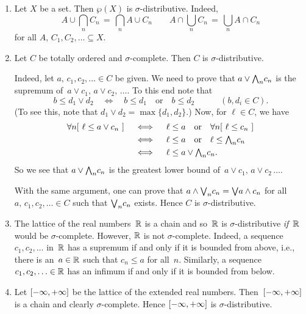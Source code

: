 \begin{exs}
\label{E:sigma-distributive}
\begin{enumerate}
\item
\label{E:sigma-distributive-sets}
Let $X$ be a set. Then $\wp(X)$ is $\sigma$-distributive.
Indeed,  
\begin{equation*}
\textstyle{
A \cup \bigcap_n C_n \,=\, \bigcap_n A \cup C_n
\qquad
A\cap \bigcup_n C_n \,=\, \bigcup_n A \cap C_n}
\end{equation*}
for all $A,\, C_1,C_2,\dotsc \subseteq X$.
\item
Let $C$ be totally ordered
and $\sigma$-complete. Then $C$ is $\sigma$-distributive.

Indeed,
let $a,\,c_1,c_2,\dotsc \in C$ be given.
We need to prove that $a \vee \textstyle{\bigwedge}_n c_n$
is the supremum of~$a\vee c_1,\,a\vee c_2,\,\dotsc$.
To this end note that 
\begin{equation*}
b \leq d_1 \vee d_2 \quad\iff\quad 
b\leq d_1\quad\text{or}\quad b\leq d_2
\qquad\quad(b,d_i\in C).
\end{equation*}
(To see this, note that $d_1 \vee d_2 = \max\{d_1,d_2\}$.)
Now, for $\ell \in C$, we have
\begin{alignat*}{3}
\forall n [\ \ell \leq a \vee c_n \ ]
\quad&\iff\quad
\ell \leq a
    \quad\text{or}\quad
    \forall n[\ \ell \leq c_n\ ] \\
\quad&\iff\quad
\ell \leq a
    \quad\text{or}\quad
    \ell \leq \textstyle{\bigwedge}_n c_n \\
\quad&\iff\quad
\ell \leq a\vee \textstyle{\bigwedge}_n c_n.
\end{alignat*}
So we see 
that $a\vee\textstyle{\bigwedge}_n c_n$ is the greatest 
lower bound of~$a\vee c_1,\,a\vee c_2\,\dotsc$.

With the same argument,
one can prove that $a \wedge \textstyle{\bigvee}_n c_n = \textstyle{\bigvee} a \wedge c_n$
for all $a,\,c_1,c_2,\dotsc \in C$
such that $\textstyle{\bigvee}_n c_n$ exists.
Hence $C$ is $\sigma$-distributive.

\item
The lattice of the real numbers~$\mathbb{R}$ is a chain
and so~$\mathbb{R}$ is $\sigma$-distributive
\emph{if}~$\mathbb{R}$ would be $\sigma$-complete.
However,
$\mathbb{R}$ is not $\sigma$-complete.
Indeed,
a sequence $c_1,c_2,\dotsc$ in~$\mathbb{R}$ has a supremum
if and only if it is bounded from above,
i.e., there is an~$a\in \mathbb{R}$ such that $c_n \leq a$
for all~$n$.
Similarly,
a sequence
$c_1,c_2,\dotsc\in \mathbb{R}$ has an infimum
if and only if it is bounded from below.

\item
Let ${[-\infty,+\infty]}$ be the lattice of the extended real numbers.
Then~${[-\infty,+\infty]}$ is a chain and clearly $\sigma$-complete.
Hence ${[-\infty,+\infty]}$ is $\sigma$-distributive.


\end{enumerate}
\end{exs}
